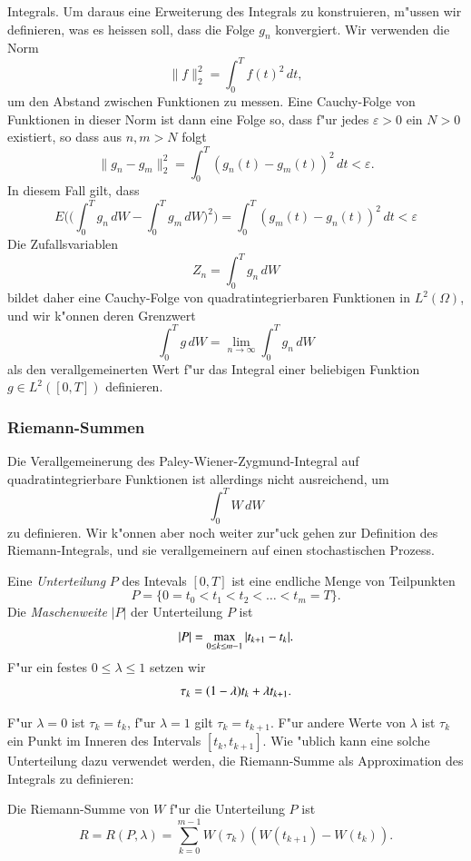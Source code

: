 Integrals. 
Um daraus eine Erweiterung des Integrals zu konstruieren, m"ussen wir 
definieren, was es heissen soll, dass die Folge $g_n$ konvergiert.
Wir verwenden die Norm
\[
\|f\|_2^2=\int_0^T f(t)^2 \,dt,
\]
um den Abstand zwischen Funktionen zu messen.
Eine Cauchy-Folge von Funktionen in dieser Norm ist dann eine Folge so,
dass f"ur jedes $\varepsilon>0$ ein $N>0$ existiert, so dass aus
$n,m>N$ folgt
\[
\|g_n-g_m\|_2^2=\int_0^T (g_n(t)-g_m(t))^2\,dt<\varepsilon.
\]
In diesem Fall gilt, dass
\[
E\biggl(
\biggl(
\int_0^T g_n\,dW
-
\int_0^T g_m\,dW
\biggr)^2
\biggr)
=
\int_0^T(g_m(t)-g_n(t))^2\,dt<\varepsilon
\]
Die Zufallsvariablen
\[
Z_n = \int_0^T g_n\,dW
\]
bildet daher eine Cauchy-Folge von quadratintegrierbaren Funktionen
in $L^2(\Omega)$, und wir k"onnen deren Grenzwert
\[
\int_0^T g\,dW
=
\lim_{n\to\infty}\int_0^T g_n\,dW
\]
als den verallgemeinerten Wert f"ur das Integral einer beliebigen Funktion
$g\in L^2([0,T])$ definieren.

\subsubsection{Riemann-Summen}
Die Verallgemeinerung des Paley-Wiener-Zygmund-Integral auf
quadratintegrierbare Funktionen ist allerdings nicht ausreichend, um
\[
\int_0^T W\,dW
\]
zu definieren.
Wir k"onnen aber noch weiter zur"uck gehen zur Definition des
Riemann-Integrals, und sie verallgemeinern auf einen stochastischen
Prozess.

\begin{definition}
Eine {\em Unterteilung} $P$ des Intevals $[0,T]$ ist eine endliche Menge
von Teilpunkten
\[
P=\{ 0=t_0<t_1<t_2<\dots<t_m=T\}.
\]
Die {\em Maschenweite} $|P|$ der Unterteilung $P$ ist
\[
|P|=\max_{0\le k\le m-1}|t_{k+1\mathstrut}-t_{k\mathstrut}|.
\]
F"ur ein festes $0\le \lambda\le 1$ setzen wir
\[
\tau_k = (1-\lambda)t_{k\mathstrut}+\lambda t_{k+1\mathstrut}.
\]
\end{definition}
F"ur $\lambda=0$ ist $\tau_k=t_k$, f"ur $\lambda=1$ gilt $\tau_k=t_{k+1}$.
F"ur andere Werte von $\lambda$ ist $\tau_k$ ein Punkt im Inneren des
Intervals $[t_k,t_{k+1}]$.
Wie "ublich kann eine solche Unterteilung dazu verwendet werden, die 
Riemann-Summe als Approximation des Integrals zu definieren:

\begin{definition}
Die Riemann-Summe von $W$ f"ur die Unterteilung $P$ ist
\[
R=R(P,\lambda) = \sum_{k=0}^{m-1} W(\tau_k)(W(t_{k+1})-W(t_k)).
\]
\end{definition}

